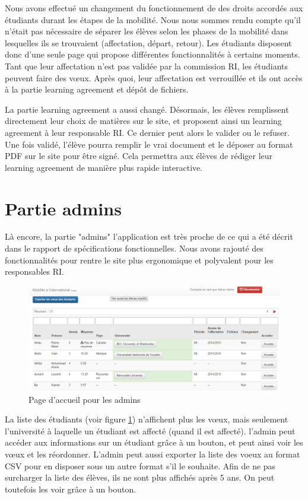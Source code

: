 Nous avons effectué un changement du fonctionnement de des droits accordés aux étudiants durant les étapes de la mobilité. Nous nous sommes rendu compte qu'il n'était pas nécessaire de séparer les élèves selon les phases de la mobilité dans lesquelles ils se trouvaient (affectation, départ, retour). Les étudiants disposent donc d'une seule page qui propose différentes fonctionnalités à certains moments. Tant que leur affectation n'est pas validée par la commission RI, les étudiants peuvent faire des vœux. Après quoi, leur affectation est verrouillée et ils ont accès à la partie learning agreement et dépôt de fichiers.
\smallbreak

La partie learning agreement a aussi changé. Désormais, les élèves remplissent directement leur choix de matières sur le site, et proposent ainsi un learning agreement à leur responsable RI. Ce dernier peut alors le valider ou le refuser.
Une fois validé, l'élève pourra remplir le vrai document et le déposer au format PDF sur le site pour être signé. Cela permettra aux élèves de rédiger leur learning agreement de manière plus rapide interactive.

\section{Partie admins}
Là encore, la partie "admins" l'application est très proche de ce qui a été décrit dans le rapport de spécifications fonctionnelles. Nous avons rajouté des fonctionnalités pour rentre le site plus ergonomique et polyvalent pour les responsables RI.

\begin{figure}
	\centering
	\includegraphics[scale=0.5]{images/accueil_admin.PNG}
	\caption{Page d'accueil pour les admins}
	\label{accueil_admins}
\end{figure}

La liste des étudiants (voir figure \ref{accueil_admins}) n'affichent plus les vœux, mais seulement l'université à laquelle un étudiant est affecté (quand il est affecté). l'admin peut accéder aux informations sur un étudiant grâce à un bouton, et peut ainsi voir les vœux et les réordonner. L'admin peut aussi exporter la liste des voeux au format CSV pour en disposer sous un autre format s'il le souhaite. Afin de ne pas surcharger la liste des élèves, ils ne sont plus affichés après 5 ans. On peut toutefois les voir grâce à un bouton.

